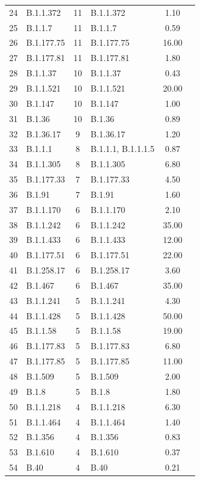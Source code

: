 \documentclass[9pt,twoside,lineno]{pnas-new}
\begin{document}
\begin{longtable}{llcp{4cm}cc}
  24 & B.1.1.372 &  11 & B.1.1.372 & 1.10 \\ 
  25 & B.1.1.7 &  11 & B.1.1.7 & 0.59 \\ 
  26 & B.1.177.75 &  11 & B.1.177.75 & 16.00 \\ 
  27 & B.1.177.81 &  11 & B.1.177.81 & 1.80 \\ 
  28 & B.1.1.37 &  10 & B.1.1.37 & 0.43 \\ 
  29 & B.1.1.521 &  10 & B.1.1.521 & 20.00 \\ 
  30 & B.1.147 &  10 & B.1.147 & 1.00 \\ 
  31 & B.1.36 &  10 & B.1.36 & 0.89 \\ 
  32 & B.1.36.17 &   9 & B.1.36.17 & 1.20 \\ 
  33 & B.1.1.1 &   8 & B.1.1.1, B.1.1.1.5 & 0.87 \\ 
  34 & B.1.1.305 &   8 & B.1.1.305 & 6.80 \\ 
  35 & B.1.177.33 &   7 & B.1.177.33 & 4.50 \\ 
  36 & B.1.91 &   7 & B.1.91 & 1.60 \\ 
  37 & B.1.1.170 &   6 & B.1.1.170 & 2.10 \\ 
  38 & B.1.1.242 &   6 & B.1.1.242 & 35.00 \\ 
  39 & B.1.1.433 &   6 & B.1.1.433 & 12.00 \\ 
  40 & B.1.177.51 &   6 & B.1.177.51 & 22.00 \\ 
  41 & B.1.258.17 &   6 & B.1.258.17 & 3.60 \\ 
  42 & B.1.467 &   6 & B.1.467 & 35.00 \\ 
  43 & B.1.1.241 &   5 & B.1.1.241 & 4.30 \\ 
  44 & B.1.1.428 &   5 & B.1.1.428 & 50.00 \\ 
  45 & B.1.1.58 &   5 & B.1.1.58 & 19.00 \\ 
  46 & B.1.177.83 &   5 & B.1.177.83 & 6.80 \\ 
  47 & B.1.177.85 &   5 & B.1.177.85 & 11.00 \\ 
  48 & B.1.509 &   5 & B.1.509 & 2.00 \\ 
  49 & B.1.8 &   5 & B.1.8 & 1.80 \\ 
  50 & B.1.1.218 &   4 & B.1.1.218 & 6.30 \\ 
  51 & B.1.1.464 &   4 & B.1.1.464 & 1.40 \\ 
  52 & B.1.356 &   4 & B.1.356 & 0.83 \\ 
  53 & B.1.610 &   4 & B.1.610 & 0.37 \\ 
  54 & B.40 &   4 & B.40 & 0.21 \\ 

\end{longtable}
\end{document}
